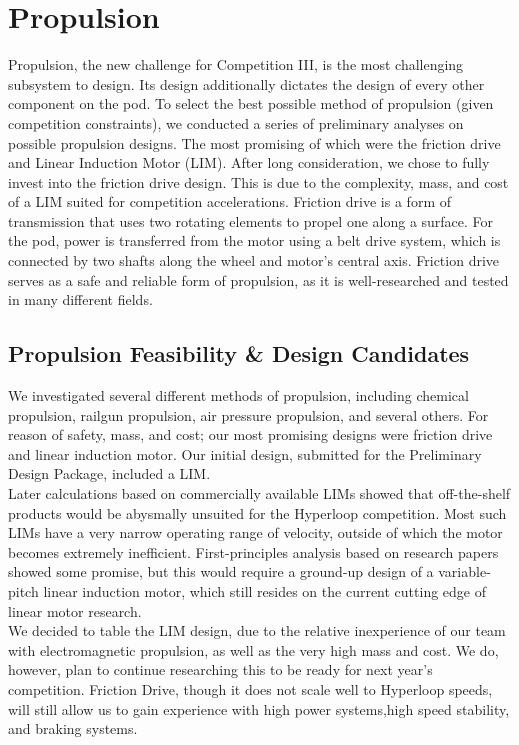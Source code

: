 \documentclass[main.tex]{subfiles}
\begin{document}
    \chapter{Propulsion}
    \label{ch:propulsion}
    Propulsion, the new challenge for Competition III, is the most challenging subsystem to design. Its design additionally dictates the design of every other component on the pod. To select the best possible method of propulsion (given competition constraints), we conducted a series of preliminary analyses on possible propulsion designs. The most promising of which were the friction drive and Linear Induction Motor (LIM). After long consideration, we chose to fully invest into the friction drive design. This is due to the complexity, mass, and cost of a LIM suited for competition accelerations. Friction drive is a form of transmission that uses two rotating elements to propel one along a surface. For the pod, power is transferred from the motor using a belt drive system, which is connected by two shafts along the wheel and motor’s central axis. Friction drive serves as a safe and reliable form of propulsion, as it is well-researched and tested in many different fields.

    \section{Propulsion Feasibility \& Design Candidates}
    We investigated several different methods of propulsion, including chemical propulsion, railgun propulsion, air pressure propulsion, and several others. For reason of safety, mass, and cost; our most promising designs were friction drive and linear induction motor. Our initial design, submitted for the Preliminary Design Package, included a LIM.\\

    Later calculations based on commercially available LIMs showed that off-the-shelf products would be abysmally unsuited for the Hyperloop competition. Most such LIMs have a very narrow operating range of velocity, outside of which the motor becomes extremely inefficient. First-principles analysis based on research papers showed some promise, but this would require a ground-up design of a variable-pitch linear induction motor, which still resides on the current cutting edge of linear motor research.\\

    We decided to table the LIM design, due to the relative inexperience of our team with electromagnetic propulsion, as well as the very high mass and cost. We do, however, plan to continue researching this to be ready for next year’s competition. Friction Drive, though it does not scale well to Hyperloop speeds, will still allow us to gain experience with high power systems,high speed stability, and braking systems.\\
\end{document}
